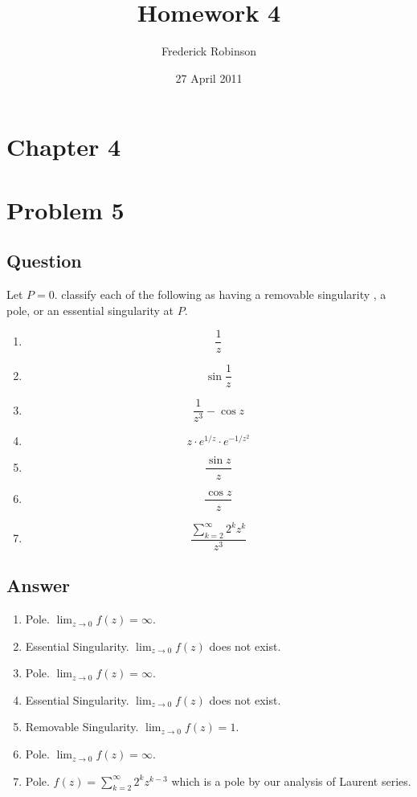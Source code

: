 \documentclass[11pt]{article}
\begin{document}



\title{Homework 4}
\author{Frederick Robinson}
\date{27 April 2011}
\maketitle


\section*{Chapter 4}

\section{Problem 5}
\subsection{Question}
Let $P=0$. classify each of the following as having a removable singularity , a pole, or an essential singularity at $P$.
\begin{enumerate}
\item \[ \frac{1}{z}\]
\item \[\sin\frac{1}{z}\]
\item \[\frac{1}{z^3} - \cos z\]
\item \[z \cdot e^{1/z} \cdot e^{-1/z^2}\]
\item \[ \frac{\sin{z}}{z}\]
\item \[\frac{\cos z}{z}\]
\item \[ \frac{\sum_{k=2}^\infty 2^kz^k}{z^3} \]
\end{enumerate}
\subsection{Answer}
\begin{enumerate}
\item Pole. $\lim_{z \to 0} f (z)= \infty$.
\item Essential Singularity. $\lim_{z \to 0}f(z)$ does not exist.
\item Pole. $\lim_{z \to 0}f(z) = \infty$.
\item Essential Singularity. $\lim_{z \to 0}f(z)$ does not exist.
\item Removable Singularity. $\lim_{z \to 0}f(z) = 1$.
\item Pole. $\lim_{z \to 0}f(z) = \infty$.
\item Pole. $f(z) = \sum_{k=2}^\infty 2^k z^{k-3} $ which is a pole by our analysis of Laurent series.
\end{enumerate}
\end{document}
